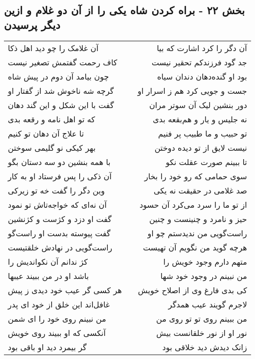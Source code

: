 \begin{center}
\section*{بخش ۲۲ - براه کردن شاه یکی را از آن دو غلام و ازین دیگر پرسیدن}
\label{sec:sh022}
\begin{longtable}{l p{0.5cm} r}
آن غلامک را چو دید اهل ذکا
&&
آن دگر را کرد اشارت که بیا
\\
کاف رحمت گفتمش تصغیر نیست
&&
جد گود فرزندکم تحقیر نیست
\\
چون بیامد آن دوم در پیش شاه
&&
بود او گنده‌دهان دندان سیاه
\\
گرچه شه ناخوش شد از گفتار او
&&
جست و جویی کرد هم ز اسرار او
\\
گفت با این شکل و این گند دهان
&&
دور بنشین لیک آن سوتر مران
\\
که تو اهل نامه و رقعه بدی
&&
نه جلیس و یار و هم‌بقعه بدی
\\
تا علاج آن دهان تو کنیم
&&
تو حبیب و ما طبیب پر فنیم
\\
بهر کیکی نو گلیمی سوختن
&&
نیست لایق از تو دیده دوختن
\\
با همه بنشین دو سه دستان بگو
&&
تا ببینم صورت عقلت نکو
\\
آن ذکی را پس فرستاد او به کار
&&
سوی حمامی که رو خود را بخار
\\
وین دگر را گفت خه تو زیرکی
&&
صد غلامی در حقیقت نه یکی
\\
آن نه‌ای که خواجه‌تاش تو نمود
&&
از تو ما را سرد می‌کرد آن حسود
\\
گفت او دزد و کژست و کژنشین
&&
حیز و نامرد و چنینست و چنین
\\
گفت پیوسته بدست او راست‌گو
&&
راست‌گویی من ندیدستم چو او
\\
راست‌گویی در نهادش خلقتیست
&&
هرچه گوید من نگویم آن تهیست
\\
کژ ندانم آن نکواندیش را
&&
متهم دارم وجود خویش را
\\
باشد او در من ببیند عیبها
&&
من نبینم در وجود خود شها
\\
هر کسی گر عیب خود دیدی ز پیش
&&
کی بدی فارغ وی از اصلاح خویش
\\
غافل‌اند این خلق از خود ای پدر
&&
لاجرم گویند عیب همدگر
\\
من نبینم روی خود را ای شمن
&&
من ببینم روی تو تو روی من
\\
آنکسی که او ببیند روی خویش
&&
نور او از نور خلقانست بیش
\\
گر بیمرد دید او باقی بود
&&
زانک دیدش دید خلاقی بود
\\

\end{longtable}
\end{center}
